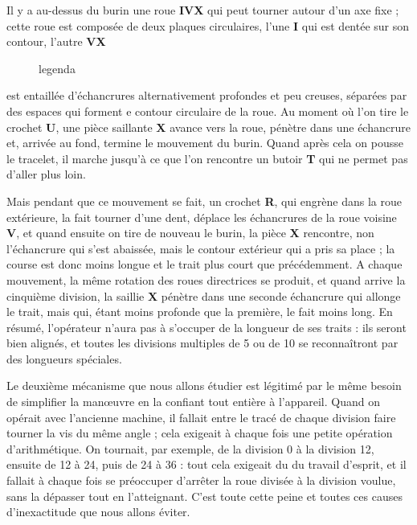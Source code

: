 \documentclass[a4paper, 12pt]{article} %
\begin{document}
Il y a au-dessus du burin une roue \textbf{IVX} qui peut tourner autour d'un axe fixe ; cette roue est composée de deux plaques circulaires, l'une \textbf{I} qui est dentée sur son contour, l'autre \textbf{VX}

\begin{figure}[H]
	\begin{center}
	\end{center}
	\caption{legenda}
	\label{fig3}
\end{figure}

est entaillée d'échancrures alternativement profondes et peu creuses, séparées par des espaces qui forment e contour circulaire de la roue. Au moment où l'on tire le crochet \textbf{U}, une pièce saillante \textbf{X} avance vers la roue, pénètre dans une échancrure et, arrivée au fond, termine le mouvement du burin. Quand après cela on pousse le tracelet, il marche jusqu'à ce que l'on rencontre un butoir \textbf{T} qui ne permet pas d'aller plus loin.

Mais pendant que ce mouvement se fait, un crochet \textbf{R}, qui engrène dans la roue extérieure, la fait tourner d'une dent, déplace les échancrures de la roue voisine \textbf{V}, et quand ensuite on tire de nouveau le burin, la pièce \textbf{X} rencontre, non l'échancrure qui s'est abaissée, mais le contour extérieur qui a pris sa place ; la course est donc moins longue et le trait plus court que précédemment. A chaque mouvement, la même rotation des roues directrices se produit, et quand arrive la cinquième division, la saillie \textbf{X} pénètre dans une seconde échancrure qui allonge le trait, mais qui, étant moins profonde que la première, le fait moins long. En résumé, l'opérateur n'aura pas à s'occuper de la longueur de ses traits : ils seront bien alignés, et toutes les divisions multiples de 5 ou de 10 se reconnaîtront par des longueurs spéciales.

Le deuxième mécanisme que nous allons étudier est légitimé par le même besoin de simplifier la manœuvre en la confiant tout entière à l'appareil. Quand on opérait avec l'ancienne machine, il fallait entre le tracé de chaque division faire tourner la vis du même angle ; cela exigeait à chaque fois une petite opération d'arithmétique. On tournait, par exemple, de la division 0 à la division 12, ensuite de 12 à 24, puis de 24 à 36 : tout cela exigeait du du travail d'esprit, et il fallait à chaque fois se préoccuper d'arrêter la roue divisée à la division voulue, sans la dépasser tout en l'atteignant. C'est toute cette peine et toutes ces causes d'inexactitude que nous allons éviter.
\end{document}
